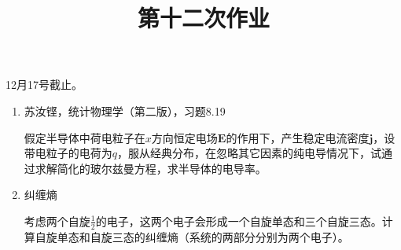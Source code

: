 \documentclass[12pt,aps,pra,notitlepage]{revtex4-1}
\begin{document}
\title{第十二次作业}
\maketitle
\begin{center}
  12月17号截止。
\end{center}
\begin{enumerate}
  \item 苏汝铿，统计物理学（第二版），习题8.19

  假定半导体中荷电粒子在$x$方向恒定电场$\bm E$的作用下，产生稳定电流密度$\bm j$，设带电粒子的电荷为$q$，服从经典分布，在忽略其它因素的纯电导情况下，试通过求解简化的玻尔兹曼方程，求半导体的电导率。

  \item 纠缠熵

  考虑两个自旋$\frac12$的电子，这两个电子会形成一个自旋单态和三个自旋三态。计算自旋单态和自旋三态的纠缠熵（系统的两部分分别为两个电子）。
\end{enumerate}
\end{document}
